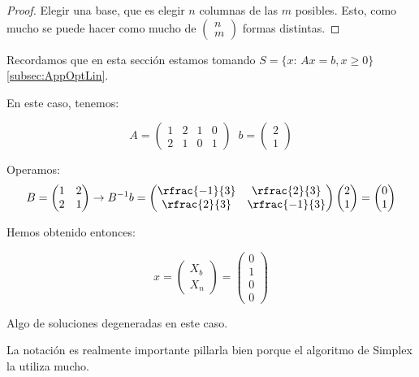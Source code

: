 \begin{proof}
Elegir una base, que es elegir $n$ columnas de las $m$ posibles. Esto, como mucho se puede hacer como mucho de $\begin{pmatrix}n\\m\end{pmatrix}$ formas distintas.
\end{proof}

\obs Recordamos que en esta sección estamos tomando $S=\{x:\, Ax=b, x\geq 0\}$ \ref{subsec:AppOptLin}.


\begin{example}
\begin{ioprob}
\end{ioprob}

\begin{figure}[h]
\centering
{}
\end{figure}


En este caso, tenemos:

\[A = \begin{pmatrix}1&2&1&0\\2&1&0&1\end{pmatrix}\;\; b = \begin{pmatrix}2\\1\end{pmatrix}\]

Operamos: \[B = \begin{pmatrix}1&2\\2&1\end{pmatrix} \to B^{-1}b = \begin{pmatrix}\rfrac{-1}{3}&\rfrac{2}{3}\\\rfrac{2}{3}&\rfrac{-1}{3}\end{pmatrix}\begin{pmatrix}2\\1\end{pmatrix} = \begin{pmatrix}0\\1\end{pmatrix}\]

Hemos obtenido entonces:

\[x = \begin{pmatrix}X_b\\\hline X_n\end{pmatrix} = \begin{pmatrix}0\\1\\\hline0\\0\end{pmatrix}\]

Algo de soluciones degeneradas en este caso.

\obs La notación es realmente importante pillarla bien porque el algoritmo de Simplex la utiliza mucho.

\end{example}

